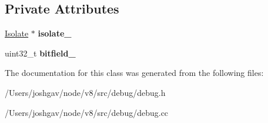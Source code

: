 \subsection*{Private Attributes}
\begin{DoxyCompactItemize}
\item 
\hyperlink{classv8_1_1internal_1_1_isolate}{Isolate} $\ast$ {\bfseries isolate\+\_\+}\hypertarget{classv8_1_1internal_1_1_debug_feature_tracker_affba0efd7632613a969cc80e3ce5d6d4}{}\label{classv8_1_1internal_1_1_debug_feature_tracker_affba0efd7632613a969cc80e3ce5d6d4}

\item 
uint32\+\_\+t {\bfseries bitfield\+\_\+}\hypertarget{classv8_1_1internal_1_1_debug_feature_tracker_aca179919eced46cb211f4d4b1ac6c7bf}{}\label{classv8_1_1internal_1_1_debug_feature_tracker_aca179919eced46cb211f4d4b1ac6c7bf}

\end{DoxyCompactItemize}


The documentation for this class was generated from the following files\+:\begin{DoxyCompactItemize}
\item 
/\+Users/joshgav/node/v8/src/debug/debug.\+h\item 
/\+Users/joshgav/node/v8/src/debug/debug.\+cc\end{DoxyCompactItemize}
